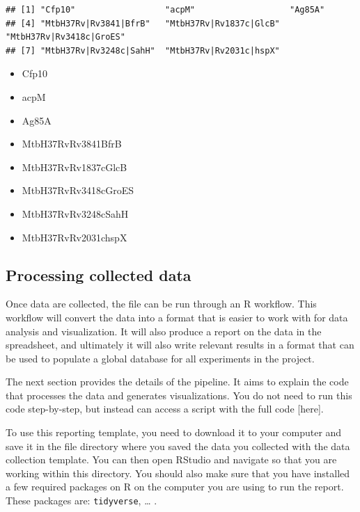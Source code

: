 \documentclass[
]{book}
\providecommand{\tightlist}{%
  \setlength{\itemsep}{0pt}\setlength{\parskip}{0pt}}
\begin{document}
\begin{verbatim}
## [1] "Cfp10"                  "acpM"                   "Ag85A"                 
## [4] "MtbH37Rv|Rv3841|BfrB"   "MtbH37Rv|Rv1837c|GlcB"  "MtbH37Rv|Rv3418c|GroES"
## [7] "MtbH37Rv|Rv3248c|SahH"  "MtbH37Rv|Rv2031c|hspX"
\end{verbatim}

\begin{itemize}
\tightlist
\item
  Cfp10
\item
  acpM
\item
  Ag85A
\item
  MtbH37Rv\textbar Rv3841\textbar BfrB
\item
  MtbH37Rv\textbar Rv1837c\textbar GlcB
\item
  MtbH37Rv\textbar Rv3418c\textbar GroES
\item
  MtbH37Rv\textbar Rv3248c\textbar SahH
\item
  MtbH37Rv\textbar Rv2031c\textbar hspX
\end{itemize}

\hypertarget{processing-collected-data-2}{%
\subsection{Processing collected data}\label{processing-collected-data-2}}

Once data are collected, the file can be run through an R workflow. This workflow
will convert the data into a format that is easier to work with for data analysis
and visualization. It will also produce a report on the data in the spreadsheet, and
ultimately it will also write relevant results in a format that can be used
to populate a global database for all experiments in the project.

The next section provides the details of the pipeline. It aims to explain the
code that processes the data and generates visualizations. You do not need to
run this code step-by-step, but instead can access a script with the full
code {[}here{]}.

To use this reporting template, you need to download it to your computer and
save it in the file directory where you saved the data you collected with the
data collection template. You can then open RStudio and navigate so that you are
working within this directory. You should also make sure that you have installed
a few required packages on R on the computer you are using to run the report.
These packages are: \texttt{tidyverse}, \ldots{} .
\end{document}
